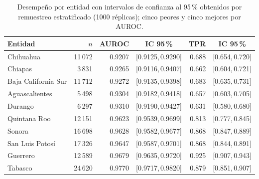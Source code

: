 
\begin{table}[htbp]
\centering
\small\setlength{\tabcolsep}{4pt}
\caption{Desempeño por entidad con intervalos de confianza al 95\,\% obtenidos
por remuestreo estratificado (1000 réplicas); cinco peores y cinco
mejores por AUROC.}
\label{tab:incertidumbre}
\begin{tabular}{l r r c r c}
\toprule
Entidad & $n$ & AUROC & IC 95\,\% & TPR & IC 95\,\% \\
\midrule
Chihuahua & 11\,072 & 0.9207 & [0.9125,\,0.9290] & 0.688 & [0.654,\,0.720] \\
Chiapas & 3\,831 & 0.9265 & [0.9116,\,0.9407] & 0.662 & [0.604,\,0.721] \\
Baja California Sur & 11\,712 & 0.9272 & [0.9135,\,0.9398] & 0.683 & [0.635,\,0.731] \\
Aguascalientes & 5\,498 & 0.9304 & [0.9182,\,0.9418] & 0.657 & [0.603,\,0.705] \\
Durango & 6\,297 & 0.9310 & [0.9190,\,0.9427] & 0.631 & [0.580,\,0.680] \\
\midrule
Quintana Roo & 12\,151 & 0.9623 & [0.9539,\,0.9699] & 0.813 & [0.777,\,0.845] \\
Sonora & 16\,698 & 0.9628 & [0.9582,\,0.9677] & 0.868 & [0.847,\,0.889] \\
San Luis Potosí & 17\,326 & 0.9647 & [0.9587,\,0.9701] & 0.868 & [0.844,\,0.891] \\
Guerrero & 12\,589 & 0.9679 & [0.9635,\,0.9720] & 0.925 & [0.907,\,0.943] \\
Tabasco & 24\,620 & 0.9770 & [0.9717,\,0.9820] & 0.879 & [0.851,\,0.907] \\
\bottomrule
\end{tabular}
\end{table}
